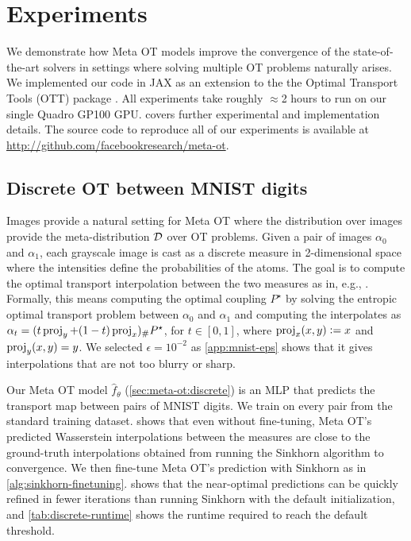 \documentclass{article}
\newcommand{\eg}{e.g.\xspace}
\newcommand{\defeq}{\vcentcolon=}
\begin{document}
\section{Experiments}\label{sec:experiments}
We demonstrate how Meta OT models improve the convergence
of the state-of-the-art solvers in settings where
solving multiple OT problems naturally arises.
We implemented our code in JAX \citep{jax2018github} as an
extension to the the Optimal Transport Tools (OTT)
package \citep{cuturi2022optimal}.
All experiments take roughly $\approx$2 hours to
run on our single Quadro GP100 GPU.
 covers further experimental
and implementation details.
The source code to reproduce all of our experiments is available at
\url{http://github.com/facebookresearch/meta-ot}.

\subsection{Discrete OT between MNIST digits}
\label{sec:exp:mnist}
Images provide a natural setting for Meta OT where the
distribution over images provide the meta-distribution
${\mathcal{D}}$ over OT problems.
Given a pair of images $\alpha_0$ and
$\alpha_1$, each grayscale image is cast as a discrete measure
in 2-dimensional space where the intensities define the probabilities of the atoms.
The goal is to compute the optimal transport interpolation between the
two measures as in, \eg, \citet[\S7]{peyre2019computational}.
Formally, this means computing the optimal coupling $P^\star$
by solving the entropic optimal transport problem between $\alpha_0$ and
$\alpha_1$ and computing the interpolates as
$\alpha_t = (t\operatorname*{proj}_y+(1-t)\operatorname*{proj}_x) _{\#}P^\star$, for $t\in [0,1]$,
where $\proj_x(x,y)\defeq x$ and $\operatorname*{proj}_y(x,y)=y$.
We selected $\epsilon=10^{-2}$ as \cref{app:mnist-eps} shows that
it gives interpolations that are not too blurry or sharp.

Our Meta OT model $\hat f_\theta$ (\cref{sec:meta-ot:discrete})
is an MLP that predicts the transport map between pairs of MNIST digits.
We train on every pair from the standard training dataset.
 shows that even without fine-tuning,
Meta OT's predicted Wasserstein interpolations between
the measures are close to the ground-truth interpolations
obtained from running the Sinkhorn algorithm to convergence.
We then fine-tune Meta OT's prediction with Sinkhorn as in
\cref{alg:sinkhorn-finetuning}.
 shows that the near-optimal predictions
can be quickly refined in fewer iterations than running
Sinkhorn with the default initialization,
and \cref{tab:discrete-runtime} shows the runtime required
to reach the default threshold.
\end{document}
